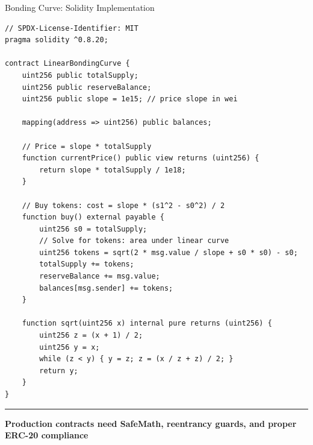 \documentclass[8pt,aspectratio=169]{beamer}
\newcommand{\bottomnote}[1]{\vfill\vspace{-2mm}\textcolor{mllavender2}{\rule{\textwidth}{0.4pt}}\vspace{1mm}\footnotesize\textbf{#1}}
\begin{document}
\begin{frame}[fragile]{Bonding Curve: Solidity Implementation}
\begin{lstlisting}
// SPDX-License-Identifier: MIT
pragma solidity ^0.8.20;

contract LinearBondingCurve {
    uint256 public totalSupply;
    uint256 public reserveBalance;
    uint256 public slope = 1e15; // price slope in wei

    mapping(address => uint256) public balances;

    // Price = slope * totalSupply
    function currentPrice() public view returns (uint256) {
        return slope * totalSupply / 1e18;
    }

    // Buy tokens: cost = slope * (s1^2 - s0^2) / 2
    function buy() external payable {
        uint256 s0 = totalSupply;
        // Solve for tokens: area under linear curve
        uint256 tokens = sqrt(2 * msg.value / slope + s0 * s0) - s0;
        totalSupply += tokens;
        reserveBalance += msg.value;
        balances[msg.sender] += tokens;
    }

    function sqrt(uint256 x) internal pure returns (uint256) {
        uint256 z = (x + 1) / 2;
        uint256 y = x;
        while (z < y) { y = z; z = (x / z + z) / 2; }
        return y;
    }
}
\end{lstlisting}
\bottomnote{Production contracts need SafeMath, reentrancy guards, and proper ERC-20 compliance}
\end{frame}
\end{document}
